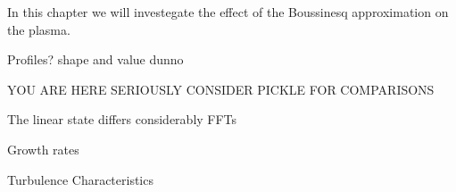 In this chapter we will investegate the effect of the Boussinesq approximation on the plasma.

Profiles?
shape and value
dunno




YOU ARE HERE
SERIOUSLY CONSIDER PICKLE FOR COMPARISONS


The linear state differs considerably
FFTs

Growth rates

Turbulence Characteristics
